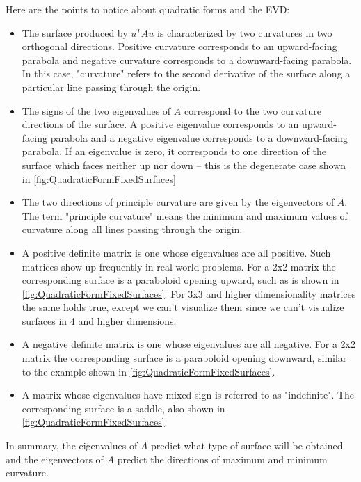 \documentclass[onefignum,onetabnum]{siamart190516}
\begin{document}
Here are the points to notice about quadratic forms and the EVD:
\begin{itemize}
	\item The surface produced by $u^T A u$ is characterized by two curvatures in two orthogonal
	directions.  Positive curvature corresponds to an upward-facing parabola and negative curvature 
	corresponds to a downward-facing parabola.  In this case, "curvature" refers to the second
	derivative of the surface along a particular line passing through the origin.
	\item The signs of the two eigenvalues of $A$ correspond to the two curvature directions 
	of the surface.  A positive eigenvalue corresponds to an upward-facing parabola and a negative 
	eigenvalue corresponds to a downward-facing parabola.  If an eigenvalue is zero, it corresponds
	to one direction of the surface which faces neither up nor down -- this is the degenerate case shown
	in \cref{fig:QuadraticFormFixedSurfaces}
	\item The two directions of principle curvature are given by the eigenvectors of $A$. The
	term "principle curvature" means the minimum and maximum values of curvature along all 
	lines passing through the origin.  
	\item A positive definite matrix is one whose eigenvalues are all positive.  Such matrices
	show up frequently in real-world problems.  For a 2x2 matrix the corresponding surface is a paraboloid opening
	upward, such as is shown in \cref{fig:QuadraticFormFixedSurfaces}.   
	For 3x3 and higher dimensionality matrices the same holds true, except we can't
	visualize them since we can't visualize surfaces in 4 and higher dimensions.
	\item A negative definite matrix is one whose eigenvalues are all negative.  For a
	2x2 matrix the corresponding surface is a paraboloid opening downward, similar to
	the example shown in \cref{fig:QuadraticFormFixedSurfaces}. 
	\item A matrix whose eigenvalues have mixed sign is referred to as "indefinite".  The
	corresponding surface is a saddle, also shown in \cref{fig:QuadraticFormFixedSurfaces}.
\end{itemize}
In summary, the eigenvalues of $A$ predict what type of surface will be
obtained and the eigenvectors of $A$ predict the directions of maximum and minimum curvature.

\end{document}
